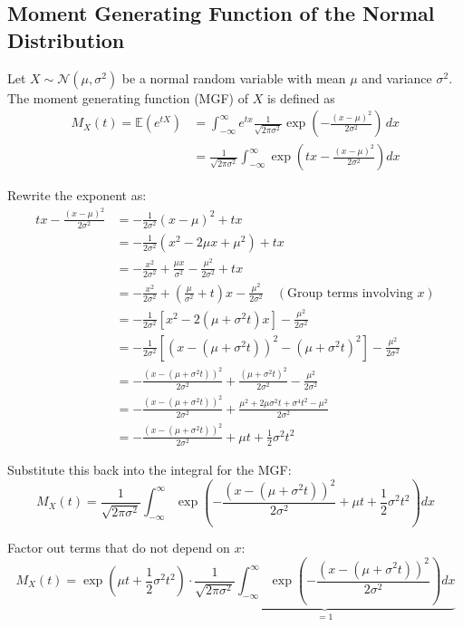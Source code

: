 \documentclass[twoside]{book}
\begin{document}
\subsection{Moment Generating Function of the Normal Distribution}

Let \( X \sim \mathcal{N}(\mu, \sigma^2) \) be a normal random variable with mean \(\mu\) and variance \(\sigma^2\). The moment generating function (MGF) of \(X\) is defined as
\begin{align*}
M_X(t) = \mathbb{E}\left( e^{tX}\right)  &= \int_{-\infty}^{\infty} e^{tx} \frac{1}{\sqrt{2\pi\sigma^2}} \exp\left(-\frac{(x-\mu)^2}{2\sigma^2}\right) \, dx \\
&=\frac{1}{\sqrt{2\pi\sigma^2}} \int_{-\infty}^{\infty} \exp\left(tx - \frac{(x-\mu)^2}{2\sigma^2}\right) dx
\end{align*}

Rewrite the exponent as:
\begin{align*}
tx - \frac{(x-\mu)^2}{2\sigma^2} &= -\frac{1}{2\sigma^2} (x-\mu)^2 + tx\\
&=-\frac{1}{2\sigma^2} (x^2 - 2\mu x + \mu^2) + t x\\
&=-\frac{x^2}{2\sigma^2} + \frac{\mu x}{\sigma^2} - \frac{\mu^2}{2\sigma^2} + t x \\
&=-\frac{x^2}{2\sigma^2} + \left(\frac{\mu}{\sigma^2} + t\right) x - \frac{\mu^2}{2\sigma^2} \quad (\text{Group terms involving } x)\\
&=-\frac{1}{2\sigma^2} \left[x^2 - 2 (\mu + \sigma^2 t) x \right] - \frac{\mu^2}{2\sigma^2}\\
&=-\frac{1}{2\sigma^2} \left[(x - (\mu + \sigma^2 t))^2 - (\mu + \sigma^2 t)^2 \right] - \frac{\mu^2}{2\sigma^2}\\
&=-\frac{(x - (\mu + \sigma^2 t))^2}{2\sigma^2} + \frac{(\mu + \sigma^2 t)^2}{2\sigma^2} - \frac{\mu^2}{2\sigma^2}\\
&=-\frac{(x - (\mu + \sigma^2 t))^2}{2\sigma^2} + \frac{\mu^2 + 2 \mu \sigma^2 t + \sigma^4 t^2 - \mu^2}{2 \sigma^2}\\
&=-\frac{(x - (\mu + \sigma^2 t))^2}{2\sigma^2} + \mu t + \frac{1}{2} \sigma^2 t^2
\end{align*}

Substitute this back into the integral for the MGF:
\[
M_X(t) = \frac{1}{\sqrt{2 \pi \sigma^2}} \int_{-\infty}^\infty \exp\left(-\frac{(x - (\mu + \sigma^2 t))^2}{2\sigma^2} + \mu t + \frac{1}{2} \sigma^2 t^2 \right) dx
\]

Factor out terms that do not depend on \(x\):
\[
M_X(t) = \exp\left(\mu t + \frac{1}{2} \sigma^2 t^2\right) \cdot \underbrace{\frac{1}{\sqrt{2 \pi \sigma^2}} \int_{-\infty}^\infty \exp\left(-\frac{(x - (\mu + \sigma^2 t))^2}{2\sigma^2}\right) dx}_{= 1}
\]
\end{document}
